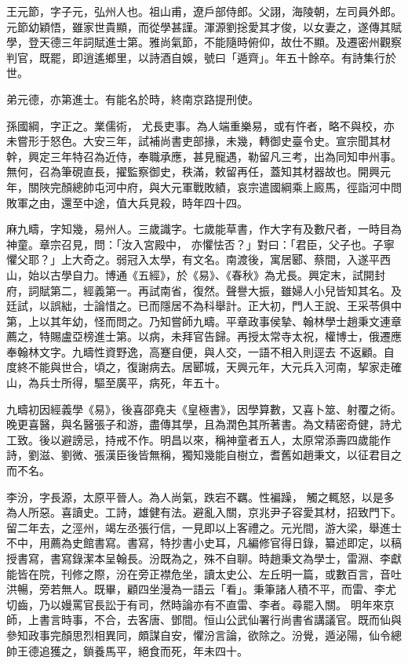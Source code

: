 \begin{pinyinscope}
 王元節，字子元，弘州人也。祖山甫，遼戶部侍郎。父詡，海陵朝，左司員外郎。元節幼穎悟，雖家世貴顯，而從學甚謹。渾源劉捴愛其才俊，以女妻之，遂傳其賦學，登天德三年詞賦進士第。雅尚氣節，不能隨時俯仰，故仕不顯。及遷密州觀察判官，既罷，即逍遙鄉里，以詩酒自娛，號曰「遁齊」。年五十餘卒。有詩集行於世。



 弟元德，亦第進士。有能名於時，終南京路提刑使。



 孫國綱，字正之。業儒術，
 尤長吏事。為人端重樂易，或有忤者，略不與校，亦未嘗形于怒色。大安三年，試補尚書吏部掾，未幾，轉御史臺令史。宣宗聞其材幹，興定三年特召為近侍，奉職承應，甚見寵遇，勒留凡三考，出為同知申州事。無何，召為筆硯直長，擢監察御史，秩滿，敕留再任，蓋知其材器故也。開興元年，關陜完顏總帥屯河中府，與大元軍戰敗績，哀宗遣國綱乘上廄馬，徑詣河中問敗軍之由，還至中途，值大兵見殺，時年四十四。



 麻九疇，字知幾，易州人。三歲識字。七歲能草書，作大字有及數尺者，一時目為神童。章宗召見，問：「汝入宮殿中，
 亦懼怯否？」對曰：「君臣，父子也。子寧懼父耶？」上大奇之。弱冠入太學，有文名。南渡後，寓居郾、蔡間，入遂平西山，始以古學自力。博通《五經》，於《易》、《春秋》為尤長。興定末，試開封府，詞賦第二，經義第一。再試南省，復然。聲譽大振，雖婦人小兒皆知其名。及廷試，以誤絀，士論惜之。已而隱居不為科舉計。正大初，門人王說、王采苓俱中第，上以其年幼，怪而問之。乃知嘗師九疇。平章政事侯摯、翰林學士趙秉文連章薦之，特賜盧亞榜進士第。以病，未拜官告歸。再授太常寺太祝，權博士，俄遷應奉翰林文字。九疇性資野逸，高蹇自便，與人交，一語不相入則逕去
 不返顧。自度終不能與世合，頃之，復謝病去。居郾城，天興元年，大元兵入河南，挈家走確山，為兵士所得，驅至廣平，病死，年五十。



 九疇初因經義學《易》，後喜邵堯夫《皇極書》，因學算數，又喜卜筮、射覆之術。晚更喜醫，與名醫張子和游，盡傳其學，且為潤色其所著書。為文精密奇健，詩尤工致。後以避謗忌，持戒不作。明昌以來，稱神童者五人，太原常添壽四歲能作詩，劉滋、劉微、張漢臣後皆無稱，獨知幾能自樹立，耆舊如趙秉文，以征君目之而不名。



 李汾，字長源，太原平晉人。為人尚氣，跌宕不羈。性褊躁，
 觸之輒怒，以是多為人所惡。喜讀史。工詩，雄健有法。避亂入關，京兆尹子容愛其材，招致門下。留二年去，之涇州，竭左丞張行信，一見即以上客禮之。元光間，游大梁，舉進士不中，用薦為史館書寫。書寫，特抄書小史耳，凡編修官得日錄，纂述即定，以稿授書寫，書寫錄潔本呈翰長。汾既為之，殊不自聊。時趙秉文為學士，雷淵、李獻能皆在院，刊修之際，汾在旁正襟危坐，讀太史公、左丘明一篇，或數百言，音吐洪暢，旁若無人。既畢，顧四坐漫為一語云「看」。秉筆諸人積不平，而雷、李尤切齒，乃以嫚罵官長訟于有司，然時論亦有不直雷、李者。尋罷入關。
 明年來京師，上書言時事，不合，去客唐、鄧間。恒山公武仙署行尚書省講議官。既而仙與參知政事完顏思烈相異同，頗謀自安，懼汾言論，欲除之。汾覺，遁泌陽，仙令總帥王德追獲之，鎖養馬平，絕食而死，年未四十。




\end{pinyinscope}
